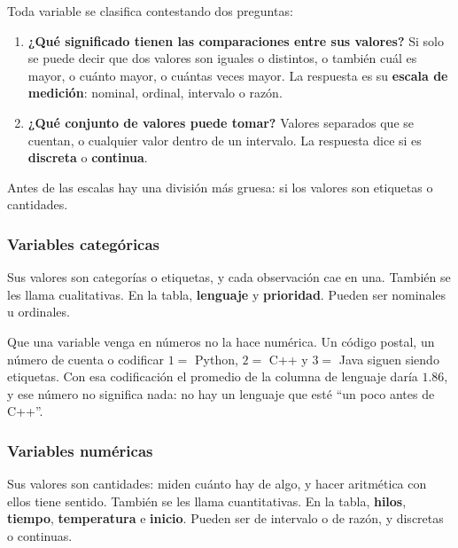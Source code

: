\documentclass[11pt,letterpaper]{article}
\begin{document}
Toda variable se clasifica contestando dos preguntas:

\begin{enumerate}[itemsep=0.3em]
    \item \textbf{¿Qué significado tienen las comparaciones entre sus
          valores?} Si solo se puede decir que dos valores son iguales
          o distintos, o también cuál es mayor, o cuánto mayor, o
          cuántas veces mayor. La respuesta es su \textbf{escala de
          medición}: nominal, ordinal, intervalo o razón.
    \item \textbf{¿Qué conjunto de valores puede tomar?} Valores
          separados que se cuentan, o cualquier valor dentro de un
          intervalo. La respuesta dice si es \textbf{discreta} o
          \textbf{continua}.
\end{enumerate}

Antes de las escalas hay una división más gruesa: si los valores son
etiquetas o cantidades.

\subsubsection*{Variables categóricas}

Sus valores son categorías o etiquetas, y cada observación cae en una.
También se les llama cualitativas. En la tabla, \textbf{lenguaje} y
\textbf{prioridad}. Pueden ser nominales u ordinales.

\begin{ojo}
    Que una variable venga en números no la hace numérica. Un código
    postal, un número de cuenta o codificar $1 =$ Python, $2 =$ C++ y
    $3 =$ Java siguen siendo etiquetas. Con esa codificación el
    promedio de la columna de lenguaje daría $1.86$, y ese número no
    significa nada: no hay un lenguaje que esté ``un poco antes de
    C++''.
\end{ojo}

\subsubsection*{Variables numéricas}

Sus valores son cantidades: miden cuánto hay de algo, y hacer
aritmética con ellos tiene sentido. También se les llama cuantitativas.
En la tabla, \textbf{hilos}, \textbf{tiempo}, \textbf{temperatura} e
\textbf{inicio}. Pueden ser de intervalo o de razón, y discretas o
continuas.

\end{document}
